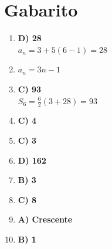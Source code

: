 \documentclass[12pt,a4paper]{article}
\begin{document}
\vspace{1cm}

\section*{Gabarito}

\begin{enumerate}
    \item \textbf{D) 28} \\
    $a_n = 3 + 5(6-1) = 28$

    \item $a_n = 3n - 1$

    \item \textbf{C) 93} \\
    $S_6 = \frac{6}{2}(3 + 28) = 93$

    \item \textbf{C) 4}

    \item \textbf{C) 3}

    \item \textbf{D) 162}

    \item \textbf{B) 3}

    \item \textbf{C) 8}

    \item \textbf{A) Crescente}

    \item \textbf{B) 1}
\end{enumerate}
\end{document}
